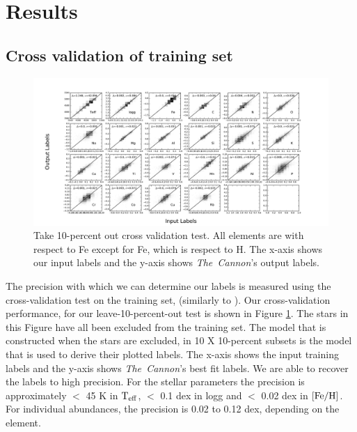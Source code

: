 \documentclass[14pt, preprint2]{aastex6}
\newcommand{\project}[1]{\textsl{#1}}
\newcommand{\tc}{\project{The~Cannon}}
\newcommand{\teff}{\mbox{$\rm T_{eff}$}}
\newcommand{\feh}{\mbox{$\rm [Fe/H]$}}
\begin{document}


\section{Results}

\subsection{Cross validation of training set} 


\begin{figure}
\includegraphics[scale=0.45]{crossval_5026.pdf} 
  \caption{Take 10-percent out cross validation test. All elements are with respect to Fe except for Fe, which is respect to H. The x-axis shows our input labels and the y-axis shows \tc's output labels. }
\label{fig:cross}
\end{figure}

The precision with which we can determine our labels is measured using the cross-validation test on the training set, (similarly to \citet{Ness2015, Ho2016, Casey2016}). Our cross-validation performance, for our leave-10-percent-out test is shown in Figure \ref{fig:cross}. The stars in this Figure have all been excluded from the training set. The model that is constructed when the stars are excluded, in 10 X 10-percent subsets is the model that is used to derive their plotted labels. The x-axis shows the input training labels and the y-axis shows \tc's best fit labels. We are able to recover the labels to high precision. For the stellar parameters the precision is approximately $<$ 45 K in \teff, $<$ 0.1 dex in logg and $<$ 0.02 dex in \feh. For individual abundances, the precision is 0.02 to 0.12 dex, depending on the element. 
\end{document}
